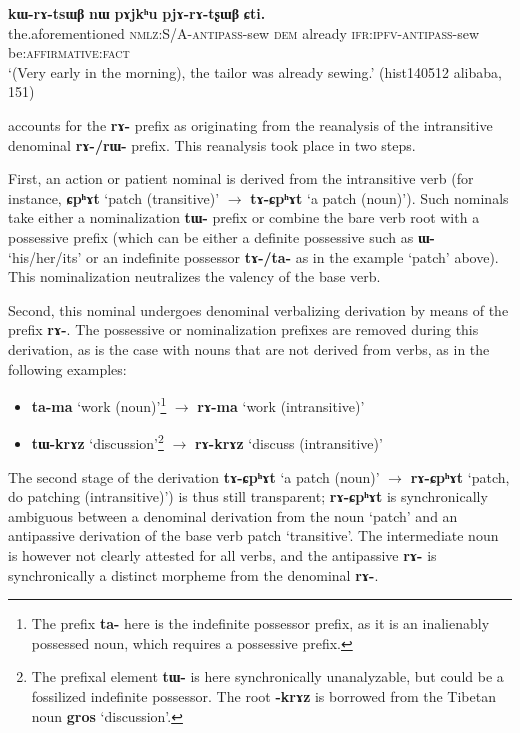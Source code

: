 \documentclass[oneside,a4paper,11pt]{article}
\newcommand{\ipa}[1]{{\phon\textbf{#1}}}
\begin{document}
\begin{exe}
\ex \label{ex:pjArAtsxWB}
\gll \ipa{iɕqʰa}	\ipa{kɯ-rɤ-tsɯβ}	\ipa{nɯ}	\ipa{pɤjkʰu}	\ipa{pjɤ-rɤ-tʂɯβ}	\ipa{ɕti.} \\
the.aforementioned \textsc{nmlz:S/A-antipass}-sew  \textsc{dem} already  \textsc{ifr:ipfv-antipass}-sew be:\textsc{affirmative:fact} \\
\glt `(Very early in the morning), the tailor was already sewing.' (hist140512 alibaba, 151)
\end{exe}

\citet{jacques14antipassive} accounts for the \ipa{rɤ-} prefix as originating from the reanalysis of the intransitive denominal \ipa{rɤ-/rɯ-} prefix. This reanalysis took place in two steps. 

First, an action or patient nominal is derived from the intransitive verb (for instance, \ipa{ɕpʰɤt} `patch (transitive)' $\rightarrow$  \ipa{tɤ-ɕpʰɤt} `a patch (noun)'). Such nominals take either a nominalization \ipa{tɯ-} prefix or combine the bare verb root with a possessive prefix (which can be either a definite possessive such as \ipa{ɯ-} `his/her/its' or an indefinite possessor \ipa{tɤ-/ta-} as in the example `patch' above). This nominalization neutralizes the valency of the base verb.

Second, this nominal undergoes denominal verbalizing derivation by means of the prefix \ipa{rɤ-}. The possessive or nominalization prefixes are removed during this derivation, as is the case with nouns that are not derived from verbs, as in the following examples:
\begin{itemize}
\item \ipa{ta-ma} `work (noun)'\footnote{The prefix \ipa{ta-} here is the indefinite possessor prefix, as it is an inalienably possessed noun, which requires a possessive prefix. }  $\rightarrow$  \ipa{rɤ-ma} `work (intransitive)'
\item \ipa{tɯ-krɤz} `discussion'\footnote{The prefixal element \ipa{tɯ-} is here synchronically unanalyzable, but could be a fossilized indefinite possessor. The root \ipa{-krɤz} is borrowed from the Tibetan noun \ipa{gros} `discussion'. } $\rightarrow$ \ipa{rɤ-krɤz} `discuss (intransitive)'
\end{itemize}

The second stage of the derivation \ipa{tɤ-ɕpʰɤt} `a patch (noun)' $\rightarrow$ \ipa{rɤ-ɕpʰɤt} `patch, do patching (intransitive)') is thus still transparent; \ipa{rɤ-ɕpʰɤt} is synchronically ambiguous between a denominal derivation from the noun `patch' and an antipassive derivation of the base verb  patch `transitive'. The intermediate noun is however not clearly attested for all verbs, and the antipassive \ipa{rɤ-} is synchronically a distinct morpheme from the denominal \ipa{rɤ-}.
\end{document}
